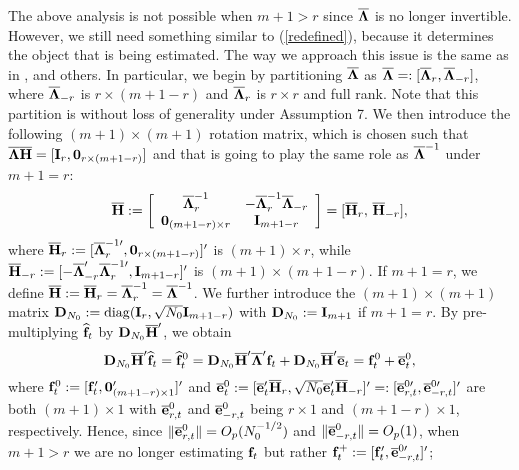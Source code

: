 \documentclass[12pt,fleqn]{article}
\begin{document}
The above analysis is not possible when $m +1> r$ since $\overline{\boldsymbol{\Lambda}}$ is no longer invertible. However, we still need something similar to (\ref{redefined}), because it determines the object that is being estimated. The way we approach this issue is the same as in \citet{westerlund2019cce}, and others. In particular, we begin by partitioning $\overline{\boldsymbol{\Lambda}}$ as $\overline{\boldsymbol{\Lambda}}=:[\overline{\boldsymbol{\Lambda}}_r, \overline{\boldsymbol{\Lambda}}_{-r}]$, where $\overline{\boldsymbol{\Lambda}}_{-r}$ is $r\times (m+1-r)$ and $\overline{\boldsymbol{\Lambda}}_r$ is $r \times r$ and full rank. Note that this partition is without loss of generality under Assumption 7. We then introduce the following $(m+1)\times (m+1)$ rotation matrix, which is chosen such that $\overline{\boldsymbol{\Lambda}}\overline{\mathbf{H}}= [\mathbf{I}_r, \mathbf{0}_{r\times (m+1-r)}]$ and that is going to play the same role as $\overline{\boldsymbol{\Lambda}}^{-1}$ under $m+1=r$:
\begin{equation}
    \overline{\mathbf{H}} :=\left[\begin{array}{cc}\overline{\boldsymbol{\Lambda}}_r^{-1} & -\overline{\boldsymbol{\Lambda}}_r^{-1}\overline{\boldsymbol{\Lambda}}_{-r}\\
    \mathbf{0}_{(m+1-r)\times r} & \mathbf{I}_{m+1-r}\end{array}\right]=[\overline{\mathbf{H}}_r,\, \overline{\mathbf{H}}_{-r}],
\end{equation}
where $\overline{\mathbf{H}}_r:=[\overline{\boldsymbol{\Lambda}}_r^{-1\prime}, \mathbf{0}_{r\times (m+1-r)} ]'$ is $(m+1)\times r$, while $\overline{\mathbf{H}}_{-r}:=[ -\overline{\boldsymbol{\Lambda}}_{-r}'\overline{\boldsymbol{\Lambda}}_r^{-1\prime}, \mathbf{I}_{m+1-r}]'$ is $(m+1)\times (m+1-r)$. If $m+1=r$, we define $\overline{\mathbf{H}}:=\overline{\mathbf{H}}_r=\overline{\boldsymbol{\Lambda}}_r^{-1}=\overline{\boldsymbol{\Lambda}}^{-1}$. We further introduce the $(m+1)\times (m+1)$ matrix $\mathbf{D}_{N_0}:= \mathrm{diag}(\mathbf{I}_r , \sqrt{N_0}\mathbf{I}_{m+1-r})$ with $\mathbf{D}_{N_0}:=\mathbf{I}_{m+1}$ if $m+1=r$. By pre-multiplying $\widehat{\mathbf{f}}_t$ by $\mathbf{D}_{N_0}\overline{\mathbf{H}}'$, we obtain
\begin{equation}\label{fhat0}
    \mathbf{D}_{N_0}\overline{\mathbf{H}}'\widehat{\mathbf{f}}_t=\widehat{\mathbf{f}}^0_t= \mathbf{D}_{N_0}\overline{\mathbf{H}}'\overline{\boldsymbol{\Lambda}}'\mathbf{f}_t+ \mathbf{D}_{N_0}\overline{\mathbf{H}}'\overline{\mathbf{e}}_t=\mathbf{f}^0_t+\overline{\mathbf{e}}^0_t,
\end{equation}
where $\mathbf{f}^0_t:=[\mathbf{f}'_t, \mathbf{0}_{(m+1-r)\times 1}']'$ and $\overline{\mathbf{e}}^0_t:=[\overline{\mathbf{e}}_{t}'\overline{\mathbf{H}}_r, \sqrt{N_0}\overline{\mathbf{e}}_{t}'\overline{\mathbf{H}}_{-r}]'=:
[\overline{\mathbf{e}}^{0\prime}_{r,t}, \overline{\mathbf{e}}^{0\prime}_{-r,t}]'$ are both $(m+1)\times 1$ with $\overline{\mathbf{e}}_{r,t}^0$ and $\overline{\mathbf{e}}_{-r,t}^0$ being $r\times 1$ and $(m+1-r)\times 1$, respectively. Hence, since $\|\overline{\mathbf{e}}_{r,t}^0\| =O_p(N_0^{-1/2})$ and $\|\overline{\mathbf{e}}_{-r,t}^0\| =O_p(1)$, when $m + 1> r$ we are no longer estimating $\mathbf{f}_t$ but rather $\mathbf{f}_t^+ := [\mathbf{f}_t', \overline{\mathbf{e}}_{-r,t}^{0\prime}]'$;
\end{document}
